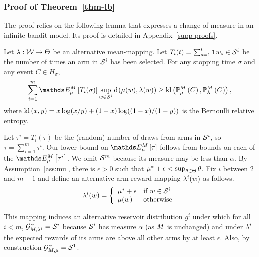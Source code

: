 \subsubsection{Proof of Theorem~\ref{thm-lb}}

The proof relies on the following lemma that expresses a change of
measure in an infinite bandit model. Its proof is detailed in
Appendix~\ref{supp-proofs}. 

\begin{lemma}\label{lem-CD} Let $\lambda : \mathcal{W} \rightarrow \Theta$ be an
alternative mean-mapping.
Let
$T_i(t) = \sum_{s=1}^t\mathbf{1}{w_s \in \mathcal{S}^{i}}$
be the number of times an arm in $\mathcal{S}^{i}$ has been
 selected.
For any stopping time $\sigma$ and
any
event $C \in H_\sigma$,
%
\vspace{-15pt}
%
\begin{align*}
\sum_{i=1}^m \ETrueModel{T_i(\sigma)} \sup_{\arm \in \ArmGrp{i}} \ArmKL{\ArmMean(\arm)}{\ArmMeanAlt(\arm)}
\geq  \BernKL{\PrTrueModel{C}}{\PrAltModel{C}},
\end{align*}
where $\operatorname{kl}\left( x, y \right)=x\log(x/y) + (1-x)\log((1-x)/(1-y))$ is the Bernoulli relative
entropy.
\end{lemma}

Let $\tau^i = T_i(\tau)$ be the (random) number of draws from arms in 
$\mathcal{S}^{i}$,
so $\tau = \sum_{i=1}^m \tau^i$. Our lower bound on $\ETrueModel{\tau}$ follows
from
bounds on each of the $\ETrueModel{\tau^i}$.
We omit $\mathcal{S}^{m}$ because its measure may be less than $\alpha$.
%
By Assumption~\ref{ass:mu}, there is $\epsilon>0$ such that $\mu^* +
\epsilon < \sup_{\theta\in \Theta} \theta$.
Fix $i$ between $2$ and $m-1$ and define an alternative arm reward mapping
$\lambda^i(w)$ as follows.
\begin{align}
\lambda^i(w) = \left\{
\begin{array}{ll}
\mu^* + \epsilon & \text{if } w \in \mathcal{S}^{i} \\
\mu(w) & \text{otherwise}
\end{array}
\right.
\end{align}

This
 mapping induces an alternative reservoir distribution $g^i$
under which for all $i < m$, 
$\mathcal{G}_{M,\lambda^i}^{\alpha} = \mathcal{S}^{i}$ because
$\mathcal{S}^{i}$ has measure $\alpha$
(as $M$ is unchanged)
and under $\lambda^i$ the expected rewards of its arms
are above all other arms by at least $\epsilon$.
Also, by construction $\mathcal{G}_{M,\mu}^{\alpha} = \mathcal{S}^{1}$.

